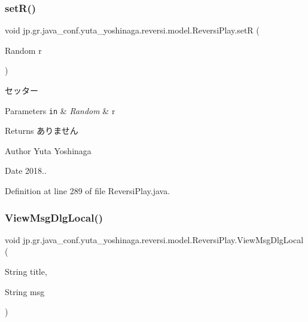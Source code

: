 \subsubsection{\texorpdfstring{set\+R()}{setR()}}
{\footnotesize\ttfamily void jp.\+gr.\+java\+\_\+conf.\+yuta\+\_\+yoshinaga.\+reversi.\+model.\+Reversi\+Play.\+setR (\begin{DoxyParamCaption}\item[{Random}]{r }\end{DoxyParamCaption})}



セッター 


\begin{DoxyParams}[1]{Parameters}
\mbox{\tt in}  & {\em Random} & r \\
\hline
\end{DoxyParams}
\begin{DoxyReturn}{Returns}
ありません 
\end{DoxyReturn}
\begin{DoxyAuthor}{Author}
Yuta Yoshinaga 
\end{DoxyAuthor}
\begin{DoxyDate}{Date}
2018.. 
\end{DoxyDate}


Definition at line 289 of file Reversi\+Play.\+java.

\mbox{\label{classjp_1_1gr_1_1java__conf_1_1yuta__yoshinaga_1_1reversi_1_1model_1_1_reversi_play_ae673231f92f3bd36a43acbc713a97513}} 
\subsubsection{\texorpdfstring{View\+Msg\+Dlg\+Local()}{ViewMsgDlgLocal()}}
{\footnotesize\ttfamily void jp.\+gr.\+java\+\_\+conf.\+yuta\+\_\+yoshinaga.\+reversi.\+model.\+Reversi\+Play.\+View\+Msg\+Dlg\+Local (\begin{DoxyParamCaption}\item[{String}]{title,  }\item[{String}]{msg }\end{DoxyParamCaption})\hspace{0.3cm}{\ttfamily [private]}}



